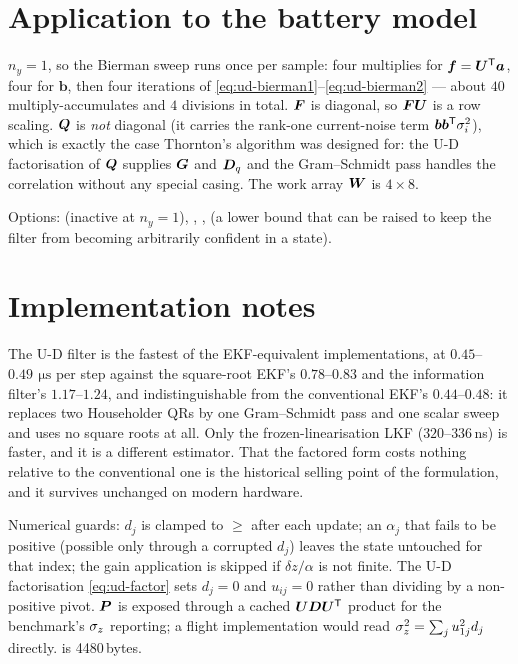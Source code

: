 \section{Application to the battery model}
$n_y=1$, so the Bierman sweep runs once per sample: four multiplies for $\bm f = \bm{U}^{\mathsf{T}}\bm a$,
four for $\bm b$, then four iterations of \eqref{eq:ud-bierman1}--\eqref{eq:ud-bierman2} ---
about $40$ multiply-accumulates and $4$ divisions in total. $\bm{F}$ is diagonal, so
$\bm{F}\bm{U}$ is a row scaling. $\bm{Q}$ is \emph{not} diagonal (it carries the rank-one
current-noise term $\bm b\bm b^{\mathsf{T}}\sigma_i^2$), which is exactly the case Thornton's algorithm
was designed for: the U-D factorisation of $\bm{Q}$ supplies $\bm{G}$ and $\bm{D}_q$ and the
Gram--Schmidt pass handles the correlation without any special casing. The work array $\bm{W}$ is
$4\times8$.

Options:  (inactive at $n_y=1$), ,
,  (a lower bound that can be raised to keep
the filter from becoming arbitrarily confident in a state).

\section{Implementation notes}
The U-D filter is the fastest of the EKF-equivalent implementations, at
$0.45$--$0.49\,\SI{}{\micro\second}$ per step against the square-root EKF's $0.78$--$0.83$ and
the information filter's $1.17$--$1.24$, and indistinguishable from the conventional EKF's
$0.44$--$0.48$: it replaces two Householder QRs by one Gram--Schmidt pass and one scalar sweep
and uses no square roots at all. Only the frozen-linearisation LKF ($320$--$336$\,ns) is
faster, and it is a different estimator. That the factored form costs nothing relative to the
conventional one is the historical selling point of the formulation, and it survives unchanged
on modern hardware.

Numerical guards: $d_j$ is clamped to $\ge$  after each update; an
$\alpha_j$ that fails to be positive (possible only through a corrupted $d_j$) leaves the
state untouched for that index; the gain application is skipped if $\delta z/\alpha$ is not
finite. The U-D factorisation \eqref{eq:ud-factor} sets $d_j = 0$ and $u_{ij} = 0$ rather than
dividing by a non-positive pivot. $\bm{P}$ is exposed through a cached $\bm{U}\bm{D}\bm{U}^{\mathsf{T}}$ product for
the benchmark's $\sigma_z$ reporting; a flight implementation would read
$\sigma_z^2 = \sum_j u_{1j}^2 d_j$ directly.
 is 4480\,bytes.

